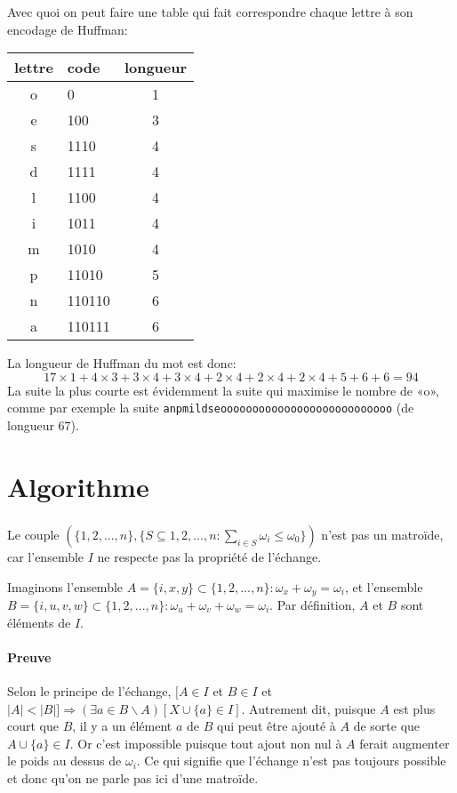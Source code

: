 \documentclass{article}
\begin{document}
\pagebreak

Avec quoi on peut faire une table qui fait correspondre chaque lettre à son encodage de Huffman:
\begin{center}
  \begin{tabular}{c|l|c}
    lettre & code  & longueur\\
    \hline \hline
    o & 0      & 1\\
    e & 100    & 3\\
    s & 1110   & 4\\
    d & 1111   & 4\\
    l & 1100   & 4\\
    i & 1011   & 4\\
    m & 1010   & 4\\
    p & 11010  & 5\\
    n & 110110 & 6\\
    a & 110111 & 6
  \end{tabular}
\end{center}
La longueur de Huffman du mot est donc:
$$ 17 \times 1 + 4 \times 3 + 3 \times 4 + 3 \times 4 + 2 \times 4 + 2 \times 4 + 2 \times 4 + 5 + 6 + 6 = 94$$
La suite la plus courte est évidemment la suite qui maximise le nombre de «o», comme par exemple la suite \texttt{anpmildseooooooooooooooooooooooooooo} (de longueur 67).

\pagebreak

\section{Algorithme}
\subsubsection{}
Le couple $(\{1, 2, ..., n\}, \{S \subseteq {1, 2, ..., n} : \sum\limits_{i \in S} \omega_i \leq \omega_0\})$ n'est pas un matroïde, car l'ensemble $I$ ne respecte pas la propriété de l'échange.

Imaginons l'ensemble $A=\{i, x, y\} \subset \{1, 2, ..., n\} : \omega_x + \omega_y = \omega_i$, et l'ensemble $B=\{i, u, v, w\} \subset \{1, 2, ..., n\} : \omega_u + \omega_v + \omega_w = \omega_i$. Par définition, $A$ et $B$ sont éléments de $I$.

\paragraph{Preuve} Selon le principe de l'échange, $[A \in I$ et $B \in I$ et $|A| < |B|] \Rightarrow (\exists a \in B \backslash A)[X \cup \{a\} \in I]$. Autrement dit, puisque $A$ est plus court que $B$, il y a un élément $a$ de $B$ qui peut être ajouté à $A$ de sorte que $A \cup \{a\} \in I$. Or c'est impossible puisque tout ajout non nul à $A$ ferait augmenter le poids au dessus de $\omega_i$. Ce qui signifie que l'échange n'est pas toujours possible et donc qu'on ne parle pas ici d'une matroïde.
\end{document}
